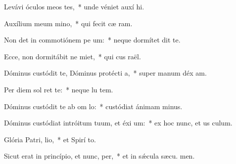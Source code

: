 \item Levávi óculos meos  tes,~* unde véniet auxí hi.
\item Auxílium meum  mino,~* qui fecit cæ  ram.
\item Non det in commotiónem pe um:~* neque dormítet  dit te.
\item Ecce, non dormitábit ne miet,~* qui cus raël.
\item Dóminus custódit te, Dóminus protécti a,~* super manum déx am.
\item Per diem sol  ret te:~* neque lu  tem.
\item Dóminus custódit te ab om lo:~* custódiat ánimam  minus.
\item Dóminus custódiat intróitum tuum, et éxi um:~* ex hoc nunc, et us  culum.
\item Glória Patri,  lio,~* et Spirí to.
\item Sicut erat in princípio, et nunc,  per,~* et in sǽcula sæcu. men.
